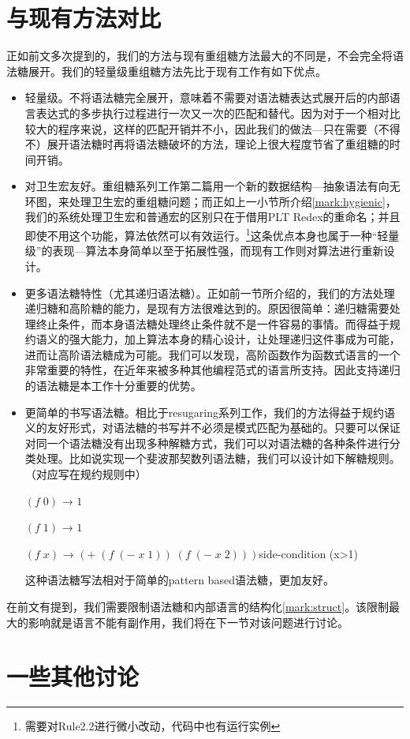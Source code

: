 \section{与现有方法对比}
正如前文多次提到的，我们的方法与现有重组糖方法最大的不同是，不会完全将语法糖展开。我们的轻量级重组糖方法先比于现有工作有如下优点。
\begin{itemize}
	\item 轻量级。不将语法糖完全展开，意味着不需要对语法糖表达式展开后的内部语言表达式的多步执行过程进行一次又一次的匹配和替代。因为对于一个相对比较大的程序来说，这样的匹配开销并不小，因此我们的做法---只在需要（不得不）展开语法糖时再将语法糖破坏的方法，理论上很大程度节省了重组糖的时间开销。
	\item 对卫生宏友好。重组糖系列工作第二篇用一个新的数据结构---抽象语法有向无环图，来处理卫生宏的重组糖问题；而正如上一小节所介绍\ref{mark:hygienic}，我们的系统处理卫生宏和普通宏的区别只在于借用PLT Redex的重命名；并且即使不用这个功能，算法依然可以有效运行。\footnote{需要对Rule2.2进行微小改动，代码中也有运行实例}这条优点本身也属于一种“轻量级”的表现---算法本身简单以至于拓展性强，而现有工作则对算法进行重新设计。
	\item 更多语法糖特性（尤其递归语法糖）。正如前一节所介绍的，我们的方法处理递归糖和高阶糖的能力，是现有方法很难达到的。原因很简单：递归糖需要处理终止条件，而本身语法糖处理终止条件就不是一件容易的事情。而得益于规约语义的强大能力，加上算法本身的精心设计，让处理递归这件事成为可能，进而让高阶语法糖成为可能。我们可以发现，高阶函数作为函数式语言的一个非常重要的特性，在近年来被多种其他编程范式的语言所支持。因此支持递归的语法糖是本工作十分重要的优势。
	\item 更简单的书写语法糖。相比于resugaring系列工作，我们的方法得益于规约语义的友好形式，对语法糖的书写并不必须是模式匹配为基础的。只要可以保证对同一个语法糖没有出现多种解糖方式，我们可以对语法糖的各种条件进行分类处理。比如说实现一个斐波那契数列语法糖，我们可以设计如下解糖规则。（对应写在规约规则中）
	
	$(f\;0)$ → $1$
	
	$(f\;1)$ → $1$
	
	$(f\;x)$ → $(+\;(f\;(-\;x\;1))\;(f\;(-\;x\;2)))$\hfill side-condition (x>1)
	
	这种语法糖写法相对于简单的pattern based语法糖，更加友好。
\end{itemize}

在前文有提到，我们需要限制语法糖和内部语言的结构化\ref{mark:struct}。该限制最大的影响就是语言不能有副作用，我们将在下一节对该问题进行讨论。
\section{一些其他讨论}



